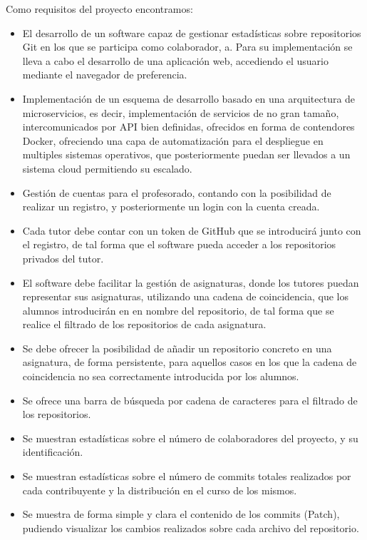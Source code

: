 Como requisitos del proyecto encontramos:

\begin{itemize}
  \item El desarrollo de un software capaz de gestionar estadísticas sobre
  repositorios Git en los que se participa como colaborador, a. Para su
  implementación se lleva a cabo el desarrollo de una aplicación web,
  accediendo el usuario mediante el navegador de preferencia.
  \item Implementación de un esquema de desarrollo basado en una arquitectura
  de microservicios, es decir, implementación de servicios de no gran
  tamaño, intercomunicados por API bien definidas, ofrecidos en forma de
  contendores Docker, ofreciendo una capa de automatización para el
  despliegue en multiples sistemas operativos, que posteriormente puedan
  ser llevados a un sistema cloud permitiendo su escalado.
	\item Gestión de cuentas para el profesorado, contando con la posibilidad de realizar un registro, y posteriormente un login con la cuenta creada.
	\item Cada tutor debe contar con un token de GitHub que se introducirá junto con el registro, de tal forma que el software pueda acceder a los repositorios privados del tutor.
	\item El software debe facilitar la gestión de asignaturas, donde los tutores puedan representar sus asignaturas, utilizando una cadena de coincidencia, que los alumnos introducirán en en nombre del repositorio, de tal forma que se realice el filtrado de los repositorios de cada asignatura.
	\item Se debe ofrecer la posibilidad de añadir un repositorio concreto en una asignatura, de forma persistente, para aquellos casos en los que la cadena de coincidencia no sea correctamente introducida por los alumnos.
	\item Se ofrece una barra de búsqueda por cadena de caracteres para el filtrado de los repositorios.
	\item Se muestran estadísticas sobre el número de colaboradores del proyecto, y su identificación.
	\item Se muestran estadísticas sobre el número de commits totales realizados por cada contribuyente y la distribución en el curso de los mismos.
	\item Se muestra de forma simple y clara el contenido de los commits (Patch), pudiendo visualizar los cambios realizados sobre cada archivo del repositorio.
 
	
\end{itemize}

